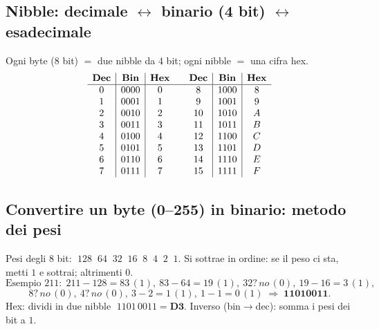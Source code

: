 \documentclass[11pt,a4paper]{report}
\begin{document}
\subsection*{Nibble: decimale $\leftrightarrow$ binario (4 bit) $\leftrightarrow$ esadecimale}
Ogni byte ($8$ bit) $=$ due nibble da $4$ bit; ogni nibble $=$ una cifra hex.
\[
\begin{array}{c|c|c @{\quad\quad} c|c|c}
\textbf{Dec} & \textbf{Bin} & \textbf{Hex} & \textbf{Dec} & \textbf{Bin} & \textbf{Hex} \\ \hline
0 & 0000 & 0 & 8  & 1000 & 8 \\
1 & 0001 & 1 & 9  & 1001 & 9 \\
2 & 0010 & 2 & 10 & 1010 & A \\
3 & 0011 & 3 & 11 & 1011 & B \\
4 & 0100 & 4 & 12 & 1100 & C \\
5 & 0101 & 5 & 13 & 1101 & D \\
6 & 0110 & 6 & 14 & 1110 & E \\
7 & 0111 & 7 & 15 & 1111 & F \\
\end{array}
\]

\subsection*{Convertire un byte (0--255) in binario: metodo dei pesi}
Pesi degli $8$ bit: $\;128\;\;64\;\;32\;\;16\;\;8\;\;4\;\;2\;\;1$. Si sottrae in
ordine: se il peso ci sta, metti $1$ e sottrai; altrimenti $0$.
\[
\text{Esempio } 211:\;
211\!-\!128\!=\!83\,(1),\ 83\!-\!64\!=\!19\,(1),\ 32?\,no\,(0),\ 19\!-\!16\!=\!3\,(1),
\]
\[
8?\,no\,(0),\ 4?\,no\,(0),\ 3\!-\!2\!=\!1\,(1),\ 1\!-\!1\!=\!0\,(1)\;\Rightarrow\;
\mathbf{11010011}.
\]
Hex: dividi in due nibble $\;1101\,0011 = \mathbf{D3}$. Inverso (bin$\to$dec):
somma i pesi dei bit a $1$.
\end{document}
